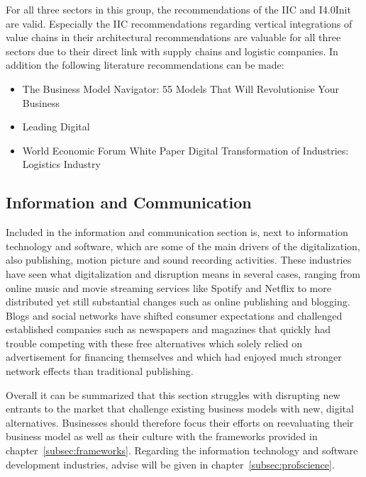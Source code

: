 For all three sectors in this group, the recommendations of the \ac{IIC} and \ac{I4.0Init} are valid. Especially the \ac{IIC} recommendations regarding vertical integrations of value chains in their architectural recommendations \cite{iicarchitecture:2016} are valuable for all three sectors due to their direct link with supply chains and logistic companies. In addition the following literature recommendations can be made:

\begin{itemize}
    \item The Business Model Navigator: 55 Models That Will Revolutionise Your Business \cite{gassmann:gallen:2013geschaeftsmodelle}
    \item Leading Digital \cite{bonnect2014leading}
    \item World Economic Forum White Paper Digital Transformation of Industries: Logistics Industry \cite{worldforumlogistics:2016}
\end{itemize}

\subsection{Information and Communication}
Included in the information and communication section is, next to information technology and software, which are some of the main drivers of the digitalization, also publishing, motion picture and sound recording activities. These industries have seen what digitalization and disruption means in several cases, ranging from online music and movie streaming services like Spotify and Netflix to more distributed yet still substantial changes such as online publishing and blogging. Blogs and social networks have shifted consumer expectations and challenged established companies such as newspapers and magazines that quickly had trouble competing with these free alternatives which solely relied on advertisement for financing themselves and which had enjoyed much stronger network effects than traditional publishing. 

Overall it can be summarized that this section struggles with disrupting new entrants to the market that challenge existing business models with new, digital alternatives. Businesses should therefore focus their efforts on reevaluating their business model as well as their culture with the frameworks provided in chapter~\ref{subsec:frameworks}. Regarding the information technology and software development industries, advise will be given in chapter~\ref{subsec:profscience}. 

